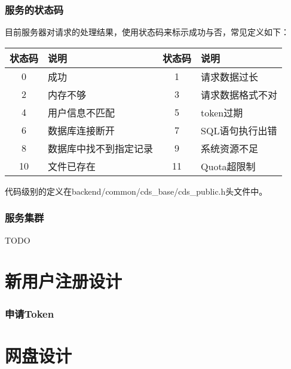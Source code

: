 \documentclass{beamer}
\begin{document}
\begin{frame}
\frametitle{服务的状态码}\label{lblServerStatusCode}

目前服务器对请求的处理结果，使用状态码来标示成功与否，常见定义如下：

\vspace{0.2cm}

\bgroup
\def\arraystretch{1.15} 
\tiny
\begin{tabular}{|c|l|c|l|}
\hline
{状态码} & {说明} & {状态码} & {说明}\\
\hline
{0} & {成功} & {1} & {请求数据过长} \\
{2} & {内存不够} & {3} & {请求数据格式不对} \\
{4} & {用户信息不匹配} & {5} & {token过期} \\
{6} & {数据库连接断开} &  {7} & {SQL语句执行出错}\\
{8} & {数据库中找不到指定记录} & {9} & {系统资源不足} \\
{10} & {文件已存在} & {11} & {Quota超限制} \\
\hline
\end{tabular}
\egroup

\vspace{0.2cm}

代码级别的定义在backend/common/cds\_base/cds\_public.h头文件中。

\end{frame}


\begin{frame}
\frametitle{服务集群}

TODO

\end{frame}


\section{新用户注册设计}

\begin{frame}
\frametitle{申请Token}


\end{frame}

\section{网盘设计}
\end{document}
